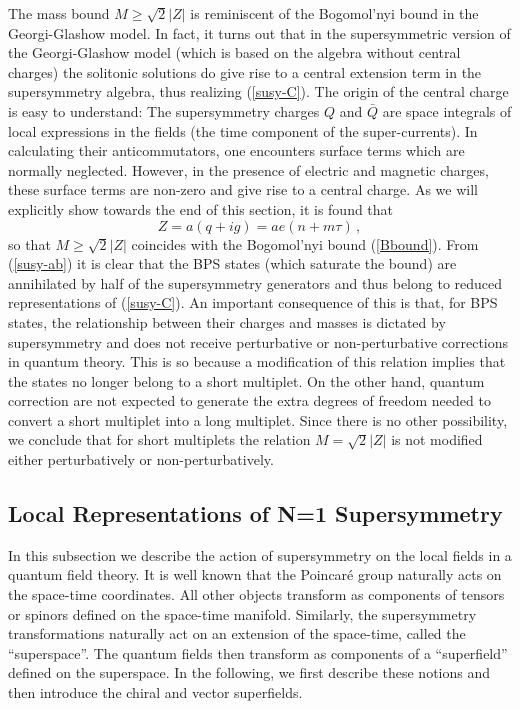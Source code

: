 The mass bound $M\geq {\sqrt 2}|Z|$ is reminiscent of the Bogomol'nyi
bound in the Georgi-Glashow model. In fact, it turns out that in the
supersymmetric version of the Georgi-Glashow model (which is based on
the algebra without central charges) the solitonic solutions do give
rise to a central extension term in the supersymmetry algebra, thus
realizing (\ref{susy-C})\cite{Olive-Witten}. The origin of the central
charge is easy to understand: The supersymmetry charges $Q$ and $\bar
Q$ are space integrals of local expressions in the fields (the time
component of the super-currents). In calculating their anticommutators,
one encounters surface terms which are normally neglected. However, in
the presence of electric and magnetic charges, these surface terms are
non-zero and give rise to a central charge. As we will explicitly show
towards the end of this section, it is found that 
\begin{equation}
Z = a (q+ig)= ae (n+m\tau)\,,
\label{Ztau}
\end{equation}
so that $M\geq {\sqrt 2}|Z|$ coincides with the Bogomol'nyi bound
(\ref{Bbound}). From (\ref{susy-ab}) it is clear that the BPS states 
(which saturate the bound) are annihilated by half of the
supersymmetry generators and thus belong to reduced representations of
(\ref{susy-C}). An important consequence of this is that, for BPS
states, the relationship between their charges and masses is dictated
by supersymmetry and does not receive perturbative or non-perturbative
corrections in quantum theory. This is so because a modification of
this relation implies that the states no longer belong to a short
multiplet. On the other hand, quantum correction are not expected to
generate the extra degrees of freedom needed to convert a short
multiplet into a long multiplet. Since there is no other possibility,
we conclude that for short multiplets the relation $M={\sqrt 2}|Z|$ is
not modified either perturbatively or non-perturbatively.    

\subsection{Local Representations of N=1 Supersymmetry}

In this subsection we describe the action of supersymmetry on the
local fields in a quantum field theory. It is well known that the 
Poincar\'{e} group naturally acts on the space-time coordinates. All
other objects transform as components of tensors or spinors defined on
the space-time manifold. Similarly, the supersymmetry transformations
naturally act on an extension of the space-time, called the
``superspace''. The quantum fields then transform as components of a  
``superfield'' defined on the superspace. In the following, we first
describe these notions and then introduce the chiral and vector
superfields.  

